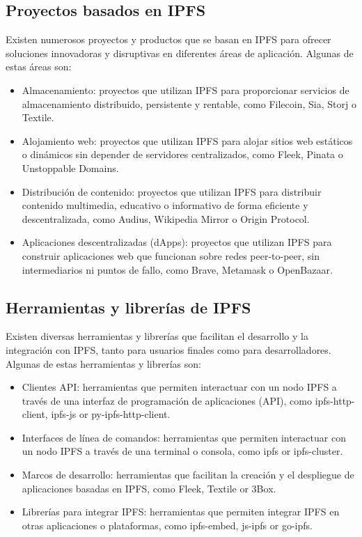 \subsection{Proyectos basados en IPFS}
Existen numerosos proyectos y productos que se basan en IPFS para ofrecer soluciones innovadoras y disruptivas en diferentes áreas de aplicación. Algunas de estas áreas son:
\begin{itemize}
      \item Almacenamiento: proyectos que utilizan IPFS para proporcionar servicios de almacenamiento distribuido, persistente y rentable, como Filecoin, Sia, Storj o Textile.
      \item Alojamiento web: proyectos que utilizan IPFS para alojar sitios web estáticos o dinámicos sin depender de servidores centralizados, como Fleek, Pinata o Unstoppable Domains.
      \item Distribución de contenido: proyectos que utilizan IPFS para distribuir contenido multimedia, educativo o informativo de forma eficiente y descentralizada, como Audius, Wikipedia Mirror o Origin Protocol.
      \item Aplicaciones descentralizadas (dApps): proyectos que utilizan IPFS para construir aplicaciones web que funcionan sobre redes peer-to-peer, sin intermediarios ni puntos de fallo, como Brave, Metamask o OpenBazaar.

\end{itemize}
\subsection{Herramientas y librerías de IPFS}
Existen diversas herramientas y librerías que facilitan el desarrollo y la integración con IPFS, tanto para usuarios finales como para desarrolladores.
Algunas de estas herramientas y librerías son:
\begin{itemize}
      \item Clientes API: herramientas que permiten interactuar con un nodo IPFS a través de una interfaz de programación de aplicaciones (API), como ipfs-http-client, ipfs-js or py-ipfs-http-client.
      \item Interfaces de línea de comandos: herramientas que permiten interactuar con un nodo IPFS a través de una terminal o consola, como ipfs or ipfs-cluster.
      \item Marcos de desarrollo: herramientas que facilitan la creación y el despliegue de aplicaciones basadas en IPFS, como Fleek, Textile or 3Box.
      \item Librerías para integrar IPFS: herramientas que permiten integrar IPFS en otras aplicaciones o plataformas, como ipfs-embed, js-ipfs or go-ipfs.

\end{itemize}
